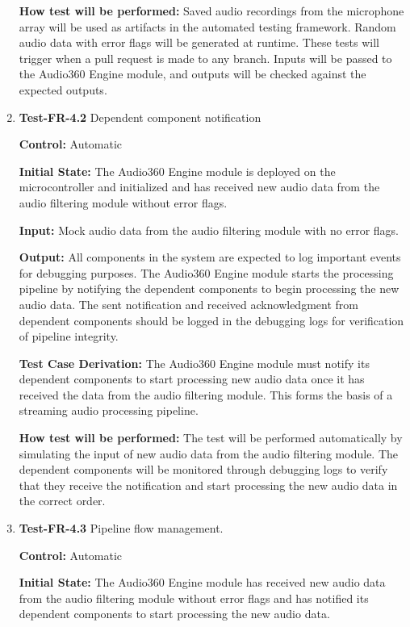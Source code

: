 \documentclass[12pt, titlepage]{article}
\begin{document}
\begin{enumerate}
\textbf{How test will be performed:}
Saved audio recordings from the microphone array will be used as artifacts in
the automated testing framework. Random audio data with error flags will be
generated at runtime. These tests will trigger when a pull request is made to
any branch. Inputs will be passed to the Audio360 Engine module, and outputs
will be checked against the expected outputs. 

\item{\textbf{Test-FR-4.2} Dependent component notification\\}

\textbf{Control:} Automatic

\textbf{Initial State:}
The Audio360 Engine module is deployed on the microcontroller and initialized
and has received new audio data from the audio filtering module without error
flags.

\textbf{Input:}
Mock audio data from the audio filtering module with no error flags.

\textbf{Output:}
All components in the system are expected to log important events for debugging
purposes. The Audio360 Engine module starts the processing pipeline by notifying
the dependent components to begin processing the new audio data. The sent
notification and received acknowledgment from dependent components should be
logged in the debugging logs for verification of pipeline integrity. 

\textbf{Test Case Derivation:}
The Audio360 Engine module must notify its dependent components to start
processing new audio data once it has received the data from the audio filtering
module. This forms the basis of a streaming audio processing pipeline.

\textbf{How test will be performed:}
The test will be performed automatically by simulating the input of new audio
data from the audio filtering module. The dependent components will be monitored
through debugging logs to verify that they receive the notification and start
processing the new audio data in the correct order. 

\item{\textbf{Test-FR-4.3} Pipeline flow management.\\}

\textbf{Control:} Automatic

\textbf{Initial State:}
The Audio360 Engine module has received new audio data from the audio filtering
module without error flags and has notified its dependent components to start
processing the new audio data.


\end{enumerate}
\end{document}
